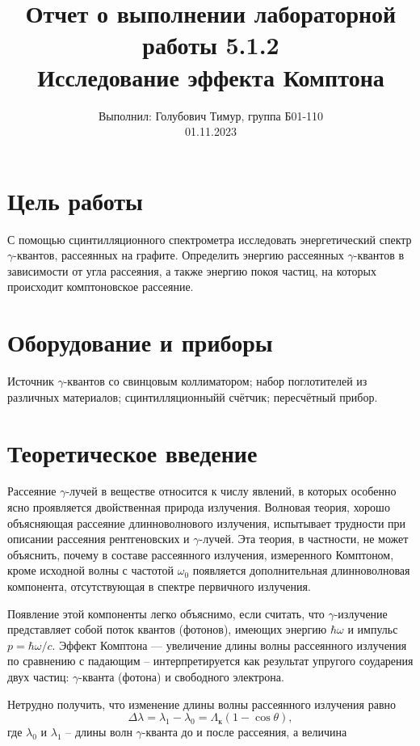 \documentclass[12pt,a4paper]{article}
\author{\normalsize Выполнил: Голубович Тимур, группа Б01-110 \\
    	\normalsize 01.11.2023}
\date{}
\title{
    	\large Отчет о выполнении лабораторной работы 5.1.2 \\
    	\Large Исследование эффекта Комптона
     }
\begin{document}
    	\maketitle

    \section*{Цель работы}

    С помощью сцинтилляционного спектрометра исследовать энергетический спектр $\gamma$-квантов, рассеянных на графите. Определить энергию рассеянных $\gamma$-квантов в зависимости от угла рассеяния, а также энергию покоя частиц, на которых происходит комптоновское рассеяние.


    \section*{Оборудование и приборы}

    Источник  $\gamma$-квантов со свинцовым коллиматором; набор поглотителей из различных материалов; сцинтилляционныйй счётчик; пересчётный прибор.
	
    \section*{Теоретическое введение}

    Рассеяние $\gamma$-лучей в веществе относится к числу явлений, в которых особенно ясно проявляется двойственная природа излучения. Волновая теория, хорошо объясняющая рассеяние длинноволнового излучения, испытывает трудности при описании рассеяния рентгеновских и $\gamma$-лучей. Эта теория, в частности, не может объяснить, почему в составе рассеянного излучения, измеренного Комптоном, кроме исходной волны с частотой $\omega_0$ появляется дополнительная длинноволновая компонента, отсутствующая в спектре первичного излучения.
	
	Появление этой компоненты легко объяснимо, если считать, что $\gamma$-излучение представляет собой поток квантов (фотонов), имеющих энергию $\hbar \omega$ и импульс $p = \hbar \omega / c$. Эффект Комптона — увеличение длины волны рассеянного излучения по сравнению с падающим -- интерпретируется как результат упругого соударения двух частиц: $\gamma$-кванта (фотона) и свободного электрона.
	
	Нетрудно получить, что изменение длины волны рассеянного излучения равно
	\begin{equation}
		\Delta \lambda = \lambda_1 - \lambda_0 = \Lambda_\text{к} (1 - \cos\theta),
		\label{Main_Compton}
	\end{equation}
	\noindent где $\lambda_0$ и $\lambda_1$ -- длины волн $\gamma$-кванта до и после рассеяния, а величина
	
\end{document}
